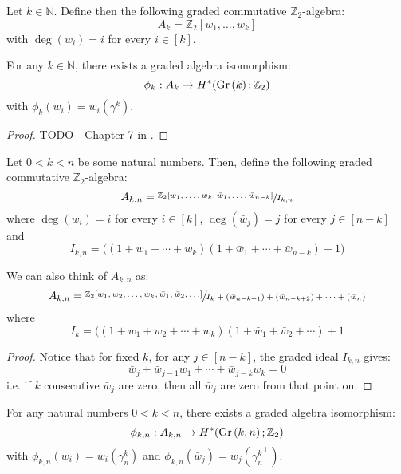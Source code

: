 

\begin{definition} Let $k\in\mathbb{N}$. Define then the following graded commutative $\mathbb{Z}_2$-algebra:
\[A_k=\mathbb{Z}_2[w_1,\ldots,w_k]\]
with $\deg(w_i)=i$ for every $i\in[k]$.
\end{definition}
\begin{theorem} For any $k\in\mathbb{N}$, there exists a graded algebra isomorphism:
\[\phi_k:A_k\to H^*(\Gr{k};\mathbb{Z}_2)\]
with $\phi_k(w_i)=w_i(\gamma^k)$.
\end{theorem}
\begin{proof} TODO - Chapter 7 in \cite{char_class}.
\end{proof}
\begin{definition} Let $0<k<n$ be some natural numbers. Then, define the following graded commutative $\mathbb{Z}_2$-algebra:
\[A_{k,n}=\sfrac{\mathbb{Z}_2[w_1,\ldots,w_k,\bar{w}_1,\ldots,\bar{w}_{n-k}]}{I_{k,n}}\]
where $\deg(w_i)=i$ for every $i\in[k]$, $\deg(\bar{w}_j)=j$ for every $j\in[n-k]$ and
\[I_{k,n}=\big((1+w_1+\cdots+w_k)(1+\bar{w}_1+\cdots+\bar{w}_{n-k})+1\big)\]
\end{definition}
\begin{proposition} We can also think of $A_{k,n}$ as:
\[A_{k,n}=\sfrac{\mathbb{Z}_2[w_1,w_2,\ldots,w_k,\bar{w}_1,\bar{w}_2,\ldots]}{I_k+(\bar{w}_{n-k+1})+(\bar{w}_{n-k+2})+\cdots+(\bar{w}_{n})}\]
where
\[I_k=\big((1+w_1+w_2+\cdots+w_k)(1+\bar{w}_1+\bar{w}_2+\cdots)+1\]
\end{proposition}
\begin{proof} Notice that for fixed $k$, for any $j\in[n-k]$, the graded ideal $I_{k,n}$ gives:
\[\bar{w}_j+\bar{w}_{j-1}w_1+\cdots+\bar{w}_{j-k}w_k=0\]
i.e. if $k$ consecutive $\bar{w}_j$ are zero, then all $\bar{w}_j$ are zero from that point on.
\end{proof}
\begin{theorem} For any natural numbers $0<k<n$, there exists a graded algebra isomorphism:
\[\phi_{k,n}:A_{k,n}\to H^*(\Gr{k}{n};\mathbb{Z}_2)\]
with $\phi_{k,n}(w_i)=w_i(\gamma^k_n)$ and $\phi_{k,n}(\bar{w}_j)=w_j({\gamma^k_n}^{\perp})$.
\end{theorem}
